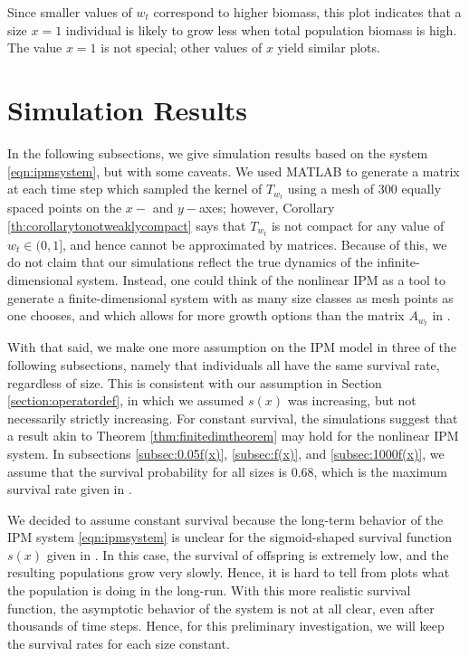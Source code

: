 Since smaller values of $w_t$ correspond to higher biomass, this plot indicates that a size $x=1$ individual is likely to grow less when total population biomass is high. The value $x=1$ is not special; other values of $x$ yield similar plots.

\begin{figure}
	
\end{figure}

\section{Simulation Results}

In the following subsections, we give simulation results based on the system \eqref{eqn:ipmsystem}, but with some caveats. We used MATLAB to generate a matrix at each time step which sampled the kernel of $T_{w_t}$ using a mesh of 300 equally spaced points on the $x-$ and $y-$axes; however, Corollary \ref{th:corollarytonotweaklycompact} says that $T_{w_t}$ is not compact for any value of $w_t \in (0,1]$, and hence cannot be approximated by matrices. Because of this, we do not claim that our simulations reflect the true dynamics of the infinite-dimensional system. Instead, one could think of the nonlinear IPM as a tool to generate a finite-dimensional system with as many size classes as mesh points as one chooses, and which allows for more growth options than the matrix $A_{w_t}$ in \cite{Callahan2019}.

With that said, we make one more assumption on the IPM model in three of the following subsections, namely that individuals all have the same survival rate, regardless of size. This is consistent with our assumption in Section \ref{section:operatordef}, in which we assumed $s(x)$ was increasing, but not necessarily strictly increasing. For constant survival, the simulations suggest that a result akin to Theorem \ref{thm:finitedimtheorem} may hold for the nonlinear IPM system. In subsections \ref{subsec:0.05f(x)}, \ref{subsec:f(x)}, and \ref{subsec:1000f(x)}, we assume that the survival probability for all sizes is $0.68$, which is the maximum survival rate given in \cite{Vindenes2014}. 

We decided to assume constant survival because the long-term behavior of the IPM system \eqref{eqn:ipmsystem} is unclear for the sigmoid-shaped survival function $s(x)$ given in \cite{Vindenes2014}. In this case, the survival of offspring is extremely low, and the resulting populations grow very slowly. Hence, it is hard to tell from plots what the population is doing in the long-run. With this more realistic survival function, the asymptotic behavior of the system is not at all clear, even after thousands of time steps. Hence, for this preliminary investigation, we will keep the survival rates for each size constant.

